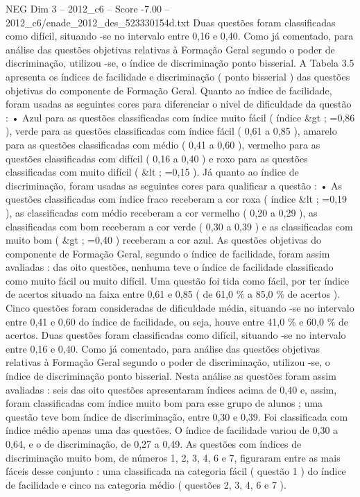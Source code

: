 \begin{textsample}{NEG Dim 3 – 2012\_c6 – Score -7.00 – 2012\_c6/enade\_2012\_des\_523330154d.txt}
Duas questões foram classificadas como difícil, situando -se no intervalo entre 0,16 e 0,40.
Como já comentado, para análise das questões objetivas relativas à Formação Geral segundo o poder de discriminação, utilizou -se, o índice de discriminação ponto bisserial.
A Tabela 3.5 apresenta os índices de facilidade e discriminação ( ponto bisserial ) das questões objetivas do componente de Formação Geral.
Quanto ao índice de facilidade, foram usadas as seguintes cores para diferenciar o nível de dificuldade da questão : • Azul para as questões classificadas com índice muito fácil ( índice \&gt ; =0,86 ), verde para as questões classificadas com índice fácil ( 0,61 a 0,85 ), amarelo para as questões classificadas com médio ( 0,41 a 0,60 ), vermelho para as questões classificadas com difícil ( 0,16 a 0,40 ) e roxo para as questões classificadas com muito difícil ( \&lt ; =0,15 ).
Já quanto ao índice de discriminação, foram usadas as seguintes cores para qualificar a questão : • As questões classificadas com índice fraco receberam a cor roxa ( índice \&lt ; =0,19 ), as classificadas com médio receberam a cor vermelho ( 0,20 a 0,29 ), as classificadas com bom receberam a cor verde ( 0,30 a 0,39 ) e as classificadas com muito bom ( \&gt ; =0,40 ) receberam a cor azul.
As questões objetivas do componente de Formação Geral, segundo o índice de facilidade, foram assim avaliadas : das oito questões, nenhuma teve o índice de facilidade classificado como muito fácil ou muito difícil.
Uma questão foi tida como fácil, por ter índice de acertos situado na faixa entre 0,61 e 0,85 ( de 61,0 \% a 85,0 \% de acertos ).
Cinco questões foram consideradas de dificuldade média, situando -se no intervalo entre 0,41 e 0,60 do índice de facilidade, ou seja, houve entre 41,0 \% e 60,0 \% de acertos.
Duas questões foram classificadas como difícil, situando -se no intervalo entre 0,16 e 0,40.
Como já comentado, para análise das questões objetivas relativas à Formação Geral segundo o poder de discriminação, utilizou -se, o índice de discriminação ponto bisserial.
Nesta análise as questões foram assim avaliadas : seis das oito questões apresentaram índices acima de 0,40 e, assim, foram classificadas com índice muito bom para esse grupo de alunos ; uma questão teve bom índice de discriminação, entre 0,30 e 0,39.
Foi classificada com índice médio apenas uma das questões.
O índice de facilidade variou de 0,30 a 0,64, e o de discriminação, de 0,27 a 0,49.
As questões com índices de discriminação muito bom, de números 1, 2, 3, 4, 6 e 7, figuraram entre as mais fáceis desse conjunto : uma classificada na categoria fácil ( questão 1 ) do índice de facilidade e cinco na categoria médio ( questões 2, 3, 4, 6 e 7 ).

\end{textsample}
